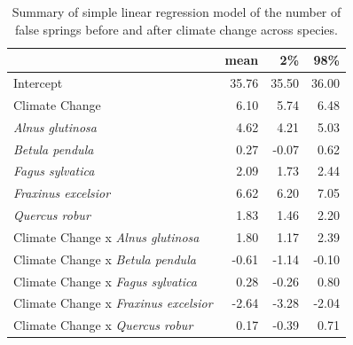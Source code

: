 \documentclass{article}\usepackage[]{graphicx}\usepackage[]{color}
\begin{document}
\begin{table}[H]
\centering
\caption{Summary of simple linear regression model of the number of false springs before and after climate change across species.} 
\label{tab:simpfs}
\begin{tabular}{lrrr}
  \hline
 & mean & 2\% & 98\% \\ 
  \hline
Intercept & 35.76 & 35.50 & 36.00 \\ 
  Climate Change & 6.10 & 5.74 & 6.48 \\ 
  \textit{Alnus glutinosa} & 4.62 & 4.21 & 5.03 \\ 
  \textit{Betula pendula} & 0.27 & -0.07 & 0.62 \\ 
  \textit{Fagus sylvatica} & 2.09 & 1.73 & 2.44 \\ 
  \textit{Fraxinus excelsior} & 6.62 & 6.20 & 7.05 \\ 
  \textit{Quercus robur} & 1.83 & 1.46 & 2.20 \\ 
  Climate Change x \textit{Alnus glutinosa} & 1.80 & 1.17 & 2.39 \\ 
  Climate Change x \textit{Betula pendula} & -0.61 & -1.14 & -0.10 \\ 
  Climate Change x \textit{Fagus sylvatica} & 0.28 & -0.26 & 0.80 \\ 
  Climate Change x \textit{Fraxinus excelsior} & -2.64 & -3.28 & -2.04 \\ 
  Climate Change x \textit{Quercus robur} & 0.17 & -0.39 & 0.71 \\ 
   \hline
\end{tabular}
\end{table}
\end{document}
